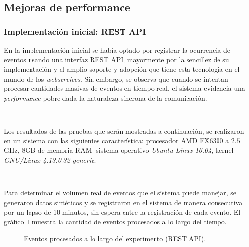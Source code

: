 \documentclass[a4paper,12pt, oneside]{article}
\begin{document}
\subsection{Mejoras de performance}
\subsubsection{Implementación inicial: REST API}
En la implementación inicial se había optado por registrar la ocurrencia de eventos usando una interfaz REST API, mayormente por la sencillez de su implementación y el amplio soporte y adopción que tiene esta tecnología en el mundo de los \textit{webservices}. Sin embargo, se observa que cuando se intentan procesar cantidades masivas de eventos en tiempo real, el sistema evidencia una \textit{performance} pobre dada la naturaleza síncrona de la comunicación.

\

Los resultados de las pruebas que serán mostradas a continuación, se realizaron en un sistema con las siguientes característica: procesador AMD FX6300 a $2.5$ GHz, 8GB de memoria RAM, sistema operativo \textit{Ubuntu Linux 16.04}, kernel \textit{GNU/Linux 4.13.0.32-generic}.

\

Para determinar el volumen real de eventos que el sistema puede manejar, se generaron datos sintéticos y se registraron en el sistema de manera consecutiva por un lapso de 10 minutos, sin espera entre la registración de cada evento. El gráfico \ref{fig:REST} muestra la cantidad de eventos procesados a lo largo del tiempo.

\begin{figure}[h]
	\centering
	
	\caption{Eventos procesados a lo largo del experimento (REST API).} \label{fig:REST}
\end{figure}
\end{document}
